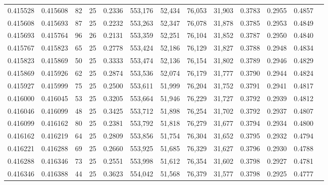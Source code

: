 \begin{tabular}{rrrrrrrrrrrrr}
0.415528 & 0.415608 &    82 &  25 &                                     0.2336 & 553,176 &  52,434 &  76,053 &  31,903 & 0.3783 & 0.2955 & 0.4857 \\
0.415608 & 0.415693 &    87 &  25 &                                     0.2232 & 553,263 &  52,347 &  76,078 &  31,878 & 0.3785 & 0.2953 & 0.4849 \\
0.415693 & 0.415764 &    96 &  26 &                                     0.2131 & 553,359 &  52,251 &  76,104 &  31,852 & 0.3787 & 0.2950 & 0.4840 \\
0.415767 & 0.415823 &    65 &  25 &                                     0.2778 & 553,424 &  52,186 &  76,129 &  31,827 & 0.3788 & 0.2948 & 0.4834 \\
0.415823 & 0.415869 &    50 &  25 &                                     0.3333 & 553,474 &  52,136 &  76,154 &  31,802 & 0.3789 & 0.2946 & 0.4829 \\
0.415869 & 0.415926 &    62 &  25 &                                     0.2874 & 553,536 &  52,074 &  76,179 &  31,777 & 0.3790 & 0.2944 & 0.4824 \\
0.415927 & 0.415999 &    75 &  25 &                                     0.2500 & 553,611 &  51,999 &  76,204 &  31,752 & 0.3791 & 0.2941 & 0.4817 \\
0.416000 & 0.416045 &    53 &  25 &                                     0.3205 & 553,664 &  51,946 &  76,229 &  31,727 & 0.3792 & 0.2939 & 0.4812 \\
0.416046 & 0.416099 &    48 &  25 &                                     0.3425 & 553,712 &  51,898 &  76,254 &  31,702 & 0.3792 & 0.2937 & 0.4807 \\
0.416099 & 0.416162 &    80 &  25 &                                     0.2381 & 553,792 &  51,818 &  76,279 &  31,677 & 0.3794 & 0.2934 & 0.4800 \\
0.416162 & 0.416219 &    64 &  25 &                                     0.2809 & 553,856 &  51,754 &  76,304 &  31,652 & 0.3795 & 0.2932 & 0.4794 \\
0.416221 & 0.416288 &    69 &  25 &                                     0.2660 & 553,925 &  51,685 &  76,329 &  31,627 & 0.3796 & 0.2930 & 0.4788 \\
0.416288 & 0.416346 &    73 &  25 &                                     0.2551 & 553,998 &  51,612 &  76,354 &  31,602 & 0.3798 & 0.2927 & 0.4781 \\
0.416346 & 0.416388 &    44 &  25 &                                     0.3623 & 554,042 &  51,568 &  76,379 &  31,577 & 0.3798 & 0.2925 & 0.4777 \\

\end{tabular}
